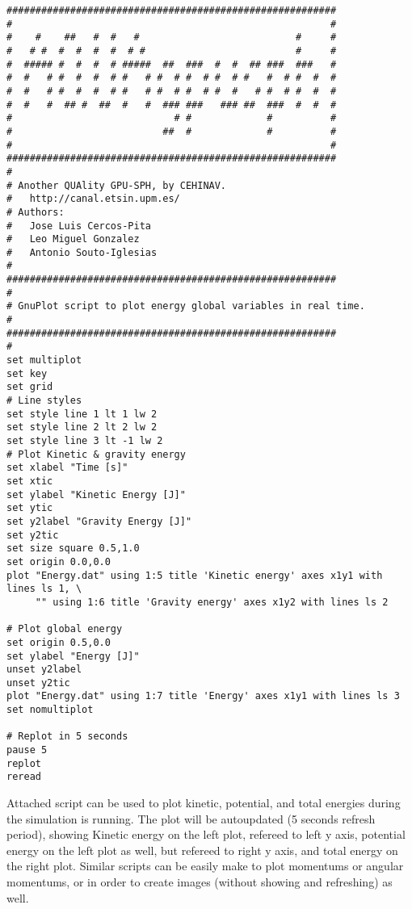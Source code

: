 \begin{verbatim}
#########################################################
#                                                       #
#    #    ##   #  #   #                           #     #
#   # #  #  #  #  #  # #                          #     #
#  ##### #  #  #  # #####  ##  ###  #  #  ## ###  ###   #
#  #   # #  #  #  # #   # #  # #  # #  # #   #  # #  #  #
#  #   # #  #  #  # #   # #  # #  # #  #   # #  # #  #  #
#  #   #  ## #  ##  #   #  ### ###   ### ##  ###  #  #  #
#                            # #             #          #
#                          ##  #             #          #
#                                                       #
#########################################################
#
# Another QUAlity GPU-SPH, by CEHINAV.
#	http://canal.etsin.upm.es/
# Authors:
#	Jose Luis Cercos-Pita
#	Leo Miguel Gonzalez
#	Antonio Souto-Iglesias
#
#########################################################
#
# GnuPlot script to plot energy global variables in real time.
#
#########################################################
#
set multiplot
set key
set grid
# Line styles
set style line 1 lt 1 lw 2
set style line 2 lt 2 lw 2
set style line 3 lt -1 lw 2
# Plot Kinetic & gravity energy
set xlabel "Time [s]"
set xtic
set ylabel "Kinetic Energy [J]"
set ytic
set y2label "Gravity Energy [J]"
set y2tic
set size square 0.5,1.0
set origin 0.0,0.0
plot "Energy.dat" using 1:5 title 'Kinetic energy' axes x1y1 with lines ls 1, \
     "" using 1:6 title 'Gravity energy' axes x1y2 with lines ls 2

# Plot global energy
set origin 0.5,0.0
set ylabel "Energy [J]"
unset y2label
unset y2tic
plot "Energy.dat" using 1:7 title 'Energy' axes x1y1 with lines ls 3
set nomultiplot

# Replot in 5 seconds
pause 5
replot
reread
\end{verbatim}
%
Attached script can be used to plot kinetic, potential, and total energies during
the simulation is running. The plot will be autoupdated (5 seconds refresh period),
showing Kinetic energy on the left plot, refereed to left y axis, potential energy
on the left plot as well, but refereed to right y axis, and total energy on the
right plot.\rc
%
Similar scripts can be easily make to plot momentums or angular momentums, or in
order to create images (without showing and refreshing) as well.
%
